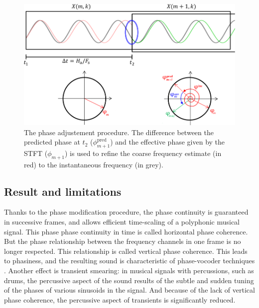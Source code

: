 \documentclass[letterpaper]{article}
\theoremstyle{definition}
\theoremstyle{remark}
\begin{document}
\begin{figure}
\includegraphics[width=\linewidth]{phase-unwrapping.png}
\caption{The phase adjustement procedure. The difference between the predicted
phase at \(t_2\) (\(\phi^{\text{pred}}_{m+1}\)) and the effective phase given by
the STFT (\(\phi_{m+1}\)) is used to refine the coarse frequency estimate (in
red) to the instantaneous frequency (in grey).}
\end{figure}

\subsection{Result and limitations}
Thanks to the phase modification procedure, the phase continuity is guaranteed
in successive frames, and allows efficient time-scaling of a polyphonic musical
signal. This phase phase continuity in time is called horizontal phase
coherence. But the phase relationship between the frequency channels in one
frame is no longer respected. This relationship is called vertical phase
coherence. This leads to phasiness, and the resulting sound is characteristic of
phase-vocoder techniques \citep{Laroche1999}. Another effect is transient
smearing: in musical signals with percussions, such as drums, the percussive
aspect of the sound results of the subtle and sudden tuning of the phases of
various sinusoids in the signal. And because of the lack of vertical phase
coherence, the percussive aspect of transients is significantly reduced.

\paragraph{}
\end{document}
